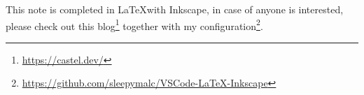 This note is completed in \LaTeX with Inkscape, in case of anyone is interested, please check out this blog\footnote{\url{https://castel.dev/}}
together with my configuration\footnote{\url{https://github.com/sleepymalc/VSCode-LaTeX-Inkscape}}.